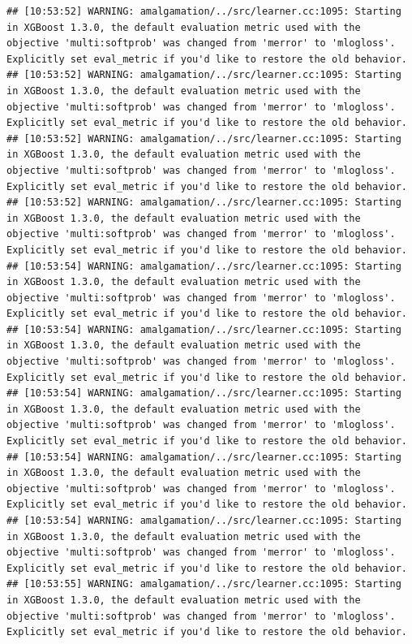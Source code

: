 \documentclass[
]{scrbook}
\begin{document}
\begin{verbatim}
## [10:53:52] WARNING: amalgamation/../src/learner.cc:1095: Starting in XGBoost 1.3.0, the default evaluation metric used with the objective 'multi:softprob' was changed from 'merror' to 'mlogloss'. Explicitly set eval_metric if you'd like to restore the old behavior.
## [10:53:52] WARNING: amalgamation/../src/learner.cc:1095: Starting in XGBoost 1.3.0, the default evaluation metric used with the objective 'multi:softprob' was changed from 'merror' to 'mlogloss'. Explicitly set eval_metric if you'd like to restore the old behavior.
## [10:53:52] WARNING: amalgamation/../src/learner.cc:1095: Starting in XGBoost 1.3.0, the default evaluation metric used with the objective 'multi:softprob' was changed from 'merror' to 'mlogloss'. Explicitly set eval_metric if you'd like to restore the old behavior.
## [10:53:52] WARNING: amalgamation/../src/learner.cc:1095: Starting in XGBoost 1.3.0, the default evaluation metric used with the objective 'multi:softprob' was changed from 'merror' to 'mlogloss'. Explicitly set eval_metric if you'd like to restore the old behavior.
## [10:53:54] WARNING: amalgamation/../src/learner.cc:1095: Starting in XGBoost 1.3.0, the default evaluation metric used with the objective 'multi:softprob' was changed from 'merror' to 'mlogloss'. Explicitly set eval_metric if you'd like to restore the old behavior.
## [10:53:54] WARNING: amalgamation/../src/learner.cc:1095: Starting in XGBoost 1.3.0, the default evaluation metric used with the objective 'multi:softprob' was changed from 'merror' to 'mlogloss'. Explicitly set eval_metric if you'd like to restore the old behavior.
## [10:53:54] WARNING: amalgamation/../src/learner.cc:1095: Starting in XGBoost 1.3.0, the default evaluation metric used with the objective 'multi:softprob' was changed from 'merror' to 'mlogloss'. Explicitly set eval_metric if you'd like to restore the old behavior.
## [10:53:54] WARNING: amalgamation/../src/learner.cc:1095: Starting in XGBoost 1.3.0, the default evaluation metric used with the objective 'multi:softprob' was changed from 'merror' to 'mlogloss'. Explicitly set eval_metric if you'd like to restore the old behavior.
## [10:53:54] WARNING: amalgamation/../src/learner.cc:1095: Starting in XGBoost 1.3.0, the default evaluation metric used with the objective 'multi:softprob' was changed from 'merror' to 'mlogloss'. Explicitly set eval_metric if you'd like to restore the old behavior.
## [10:53:55] WARNING: amalgamation/../src/learner.cc:1095: Starting in XGBoost 1.3.0, the default evaluation metric used with the objective 'multi:softprob' was changed from 'merror' to 'mlogloss'. Explicitly set eval_metric if you'd like to restore the old behavior.

\end{verbatim}
\end{document}

